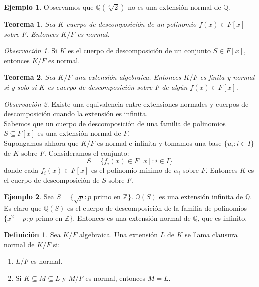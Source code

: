 \documentclass{report}
\newtheorem{theorem}{Teorema}[chapter]
\theoremstyle{remark}
\newtheorem*{remark}{Observación}
\theoremstyle{definition}
\newtheorem{definition}{Definición}[chapter]
\theoremstyle{definition}
\theoremstyle{definition}
\newtheorem*{example}{Ejemplo}
\begin{document}
\begin{example}
    Observamos que $\mathbb{Q}(\sqrt[3]{2})$ no es una extensión normal de $\mathbb{Q}$.
\end{example}

\begin{theorem}
    Sea $K$ cuerpo de descomposición de un polinomio $f(x) \in F[x]$ sobre $F$. Entonces $K/F$ es normal.
\end{theorem}

\begin{remark}
    Si $K$ es el cuerpo de descomposición de un conjunto $S \in F[x]$, entonces $K/F$ es normal.
\end{remark}

\begin{theorem}
    Sea $K/F$ una extensión algebraica. Entonces $K/F$ es finita y normal si y solo si $K$ es cuerpo de descomposición sobre $F$ de algún $f(x) \in F[x]$.
\end{theorem}

\begin{remark}
    Existe una equivalencia entre extensiones normales y cuerpos de descomposición cuando la extensión es infinita.\\
    Sabemos que un cuerpo de descomposición de una familia de polinomios $S \subseteq F[x]$ es una extensión normal de $F$.\\
    Supongamos ahhora que $K/F$ es normal e infinita y tomamos una base $\{ u_i : i \in I \}$ de $K$ sobre $F$. Consideramos el conjunto:
    $$S = \{ f_i(x) \in F[x] : i \in I \}$$
    donde cada $f_i(x) \in F[x]$ es el polinomio mínimo de $\alpha_i$ sobre $F$. Entonces $K$ es el cuerpo de descomposición de $S$ sobre $F$.
\end{remark}

\begin{example}
    Sea $S = \{ \sqrt{p} : p \text{ primo en } \mathbb{Z} \}$. $\mathbb{Q}(S)$ es una extensión infinita de $\mathbb{Q}$.\\
    Es claro que $\mathbb{Q}(S)$ es el cuerpo de descomposición de la familia de polinomios $\{ x^2-p : p \text{ primo en } \mathbb{Z} \}$.
    Entonces es una extensión normal de $\mathbb{Q}$, que es infinito.
\end{example}

\begin{definition}
    Sea $K/F$ algebraica. Una extensión $L$ de $K$ se llama clausura normal de $K/F$ si:
    \begin{enumerate}
        \item $L/F$ es normal.
        \item Si $K \subseteq M \subseteq L$ y $M/F$ es normal, entonces $M = L$.
    \end{enumerate}
\end{definition}
\end{document}
